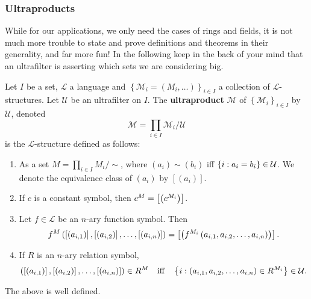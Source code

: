 \documentclass[draft]{amsart}
\newcommand{\EL}{\mathcal{L}}
\newcommand{\M}{\mathcal{M}}
\newcommand{\U}{\mathcal{U}}
\begin{document}
\subsubsection{Ultraproducts}
    While for our applications, we only need the cases of rings and fields, it is not much more trouble to state and prove definitions and theorems in their generality, and far more fun! In the following keep in the back of your mind that an ultrafilter is asserting which sets we are considering big.
    \begin{defn}\label{defn:ultraproduct}
        Let \(I\) be a set, \(\EL\) a language and \(\left\{\M_i=(M_i,\dots)\right\}_{i\in I}\) a collection of \(\EL\)-structures. Let \(\U\) be an ultrafilter on \(I\). The \textbf{ultraproduct} \(\M\) of \(\left\{\M_i\right\}_{i\in I}\) by \(\U\), denoted
        \[\M=\prod_{i\in I}\M_i \big/\U\]
        is the \(\EL\)-structure defined as follows:
        \begin{enumerate}[label=(\roman*)]
            \item As a set \label{defn:ultraproduct:set}\(M=\prod_{i\in I}M_i \big/\sim\), where \((a_i)\sim (b_i)\) iff \(\set{i}{a_i=b_i}\in \U\). We denote the equivalence class of \((a_i)\) by \([(a_i)]\).
            \item \label{defn:ultraproduct:const}If \(c\) is a constant symbol, then \(c^M=\left[\left( c^{M_i} \right)\right]\).
            \item \label{defn:ultraproduct:function}Let \(f\in \EL\) be an \(n\)-ary function symbol. Then 
            \[f^M\left(  \left[(a_{i,1})\right],\left[(a_{i,2})\right],\dots,\left[(a_{i,n})\right] \right)=\left[ \left( f^{M_i}\left( a_{i,1},a_{i,2},\dots ,a_{i,n} \right)  \right)\right].\]
            \item \label{defn:ultraproduct:relation}If \(R\) is an \(n\)-ary relation symbol,
            \[\p{\left[(a_{i,1})\right],\left[(a_{i,2})\right],\dots,\left[(a_{i,n})\right]}\in R^M \quad\text{iff}\quad  \set{i}{\p{a_{i,1},a_{i,2},\dots ,a_{i,n}}\in R^{M_i}}\in \U.\]
        \end{enumerate}
    \end{defn}
    \begin{prop}
        The above is well defined.
    \end{prop}
\end{document}
